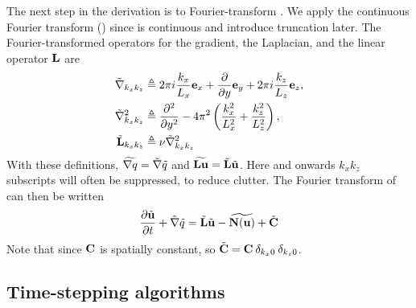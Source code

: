 \documentclass{article}[12pt]
\begin{document}
The next step in the derivation is to Fourier-transform .
We apply the continuous Fourier transform () since
 is continuous and introduce truncation later.
The Fourier-transformed operators for the gradient, the Laplacian,
and the linear operator ${\bf L}$ are
\begin{align}
\tilde{\bf \nabla}_{k_x k_z} &\triangleq 2 \pi i \frac{k_x}{L_x} {\bf e}_x + \frac{\partial}{\partial y} {\bf e}_y  + 2 \pi i \frac{k_z}{L_z} {\bf e}_z \label{tgrad}, \\
\tilde{\nabla}^2_{k_x k_z} &\triangleq \frac{\partial^2}{\partial y^2}  - 4 \pi^2 \left(
\frac{k_x^2}{L_x^2} + \frac{k_z^2}{L_z^2}\right), \\
\tilde{{\bf L}}_{k_x k_z} &\triangleq \nu \tilde{\nabla}^2_{k_x k_z}
\end{align}
With these definitions, $\widetilde{{\bf \nabla} q} = \tilde{\bf \nabla} \tilde{q}$ and
$\widetilde{{\bf L} {\bf u}} = \tilde{{\bf L}} \tilde{{\bf u}}$. Here and onwards $k_x k_z$
subscripts will often be suppressed, to reduce clutter. The Fourier
transform of  can then be written
\begin{align}
\frac{\partial \tilde{{\bf u}}}{\partial t} + \tilde{\bf \nabla} \tilde{q} = \tilde{{\bf L}} \tilde{{\bf u}} - \widetilde{{\bf N}({\bf u})} + \tilde{{\bf C}} \label{NS3a}
\end{align}
Note that since ${\bf C}$ is spatially constant, so
${\tilde{{\bf C}}} = {\bf C} \: \delta_{k_x 0} \: \delta_{k_z 0}$.



\subsection{Time-stepping algorithms}
\label{sec:timestep_algorithms}
\end{document}
